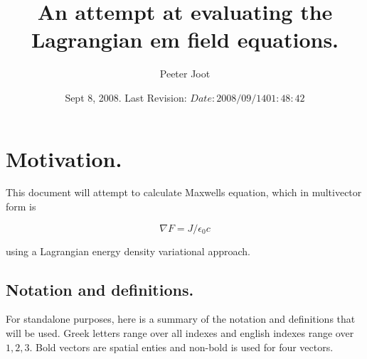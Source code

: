 \documentclass{article}
\title{ An attempt at evaluating the Lagrangian em field equations. }
\author{Peeter Joot}
\date{ Sept 8, 2008.  Last Revision: $Date: 2008/09/14 01:48:42 $ }
\newcommand{\grad}[0]{\nabla}
\begin{document}
\tableofcontents

\maketitle{}

\section{ Motivation. }

This document will attempt to calculate Maxwells equation, which in multivector form is

\begin{equation}\label{eqn:maxwell}
\grad F = J/\epsilon_0 c
\end{equation}

using a Lagrangian energy density variational approach.

\subsection{ Notation and definitions. }

For standalone purposes, here is a summary of the notation and definitions that will be used.  Greek letters range over all indexes and
english indexes range over $1,2,3$.  Bold vectors are spatial enties and non-bold is used for four vectors.
\end{document}
